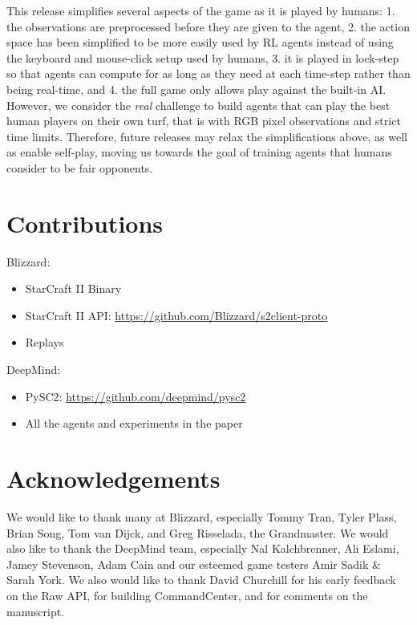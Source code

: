 \documentclass{article}
\begin{document}
This release simplifies several aspects of the game as it is played by humans: 1. the observations are preprocessed before they are given to the agent, 2. the action space has been simplified to be more easily used by RL agents instead of using the keyboard and mouse-click setup used by humans, 3. it is played in lock-step so that agents can compute for as long as they need at each time-step rather than being real-time, and 4. the full game only allows play against the built-in AI. However, we consider the \emph{real} challenge to build agents that can play the best human players on their own turf, that is with RGB pixel observations and strict time limits. Therefore, future releases may relax the simplifications above, as well as enable self-play, moving us towards the goal of training agents that humans consider to be fair opponents.

 
\section*{Contributions}

Blizzard:

\begin{itemize}
    \item StarCraft II Binary
    \item StarCraft II API: \url{https://github.com/Blizzard/s2client-proto}
    \item Replays
\end{itemize}

DeepMind:

\begin{itemize}
    \item PySC2: \url{https://github.com/deepmind/pysc2}
    \item All the agents and experiments in the paper
\end{itemize}

\section*{Acknowledgements}

We would like to thank many at Blizzard, especially Tommy Tran, Tyler Plass, Brian Song, Tom van Dijck, and Greg Risselada, the Grandmaster. We would also like to thank the DeepMind team, especially Nal Kalchbrenner, Ali Eslami, Jamey Stevenson, Adam Cain and our esteemed game testers Amir Sadik \& Sarah York. We also would like to thank David Churchill for his early feedback on the Raw API, for building CommandCenter, and for comments on the manuscript.



\end{document}
